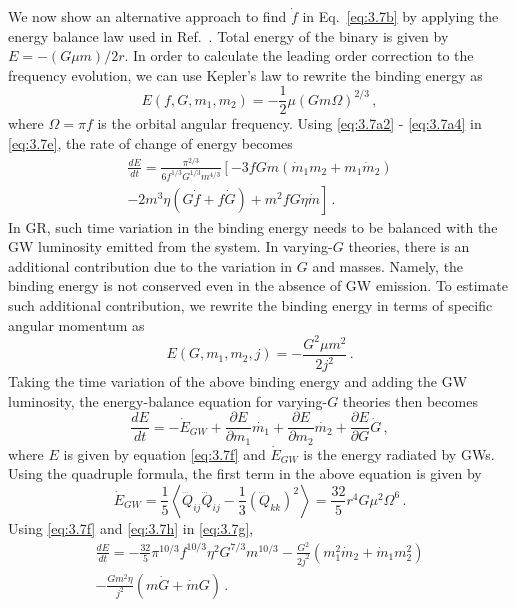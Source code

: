\documentclass[prd,twocolumn,nofootinbib]{revtex4-1}
\begin{document}
 
We now show an alternative approach to find $\dot f$ in Eq.~\eqref{eq:3.7b} by applying the energy balance law used in Ref.~\cite{Yunes:2009bv}. Total energy of the binary is given by $E=-(G\mu m)/2r$. In order to calculate the leading order correction to the frequency evolution, we can use Kepler's law to rewrite the binding energy as 
 \begin{equation}\label{eq:3.7e}
 E(f,G,m_1,m_2)=-\frac{1}{2}\mu (Gm\Omega)^{2/3}\,,
 \end{equation}
 where $\Omega=\pi f$ is the orbital angular frequency. Using \eqref{eq:3.7a2} - \eqref{eq:3.7a4} in  \eqref{eq:3.7e}, the rate of change of energy becomes
 \begin{align}\label{eq:3.7j}
 \frac{d E}{d t}=\frac{\pi^{2/3}}{6f^{1/3}G^{1/3}m^{4/3}}\left[-3fGm(\dot{m}_1m_2+m_1\dot{m}_2)\right.\nonumber\\ \left.-2m^3\eta(G\dot{f}+f\dot{G})+m^2fG\eta\dot{m}\right]\,.
 \end{align}
In GR, such time variation in the binding energy needs to be balanced with the GW luminosity emitted from the system. In varying-$G$ theories, there is an additional contribution due to the variation in $G$ and masses. Namely, the binding energy is not conserved even in the absence of GW emission. To estimate such additional contribution, we rewrite the binding energy in terms of specific angular momentum as
 \begin{equation}\label{eq:3.7f}
 E(G,m_1,m_2,j)=-\frac{G^2 \mu  m^2}{2 j^2}\,.
 \end{equation}
Taking the time variation of the above binding energy and adding the GW luminosity, the energy-balance equation for varying-$G$ theories then becomes
 \begin{equation}\label{eq:3.7g}
\frac{d E}{d t}=-\dot{E}_{GW}+\frac{\partial E}{\partial m_1}\dot{m_1}+\frac{\partial E}{\partial m_2}\dot{m_2}+\frac{\partial E}{\partial G}\dot{G}\,,
 \end{equation}
 where $E$ is given by equation \eqref{eq:3.7f} and $\dot{E}_{GW}$ is the energy radiated by GWs. Using the quadruple formula, the first term in the above equation is given by
 \begin{equation}\label{eq:3.7h}
 \dot{E}_{GW}=\frac{1}{5}\left \langle\dddot{Q}_{ij}\dddot{Q}_{ij}-\frac{1}{3}(\dddot{Q}_{kk})^2\right \rangle=\frac{32}{5} r^4 G \mu ^2 \Omega ^6\,.
 \end{equation}
Using \eqref{eq:3.7f} and \eqref{eq:3.7h} in \eqref{eq:3.7g},
 \begin{align}\label{eq:3.7i}
\frac{d E}{d t}=- \frac{32}{5} \pi ^{10/3} f^{10/3} \eta ^2 G^{7/3} m^{10/3}-\frac{G^2}{2j^2}(m_1^2\dot{m}_2+\dot{m}_1 m_2^2)\nonumber\\-\frac{Gm^2\eta}{j^2}(m\dot{G}+\dot{m}G)\,.
 \end{align}
\end{document}

